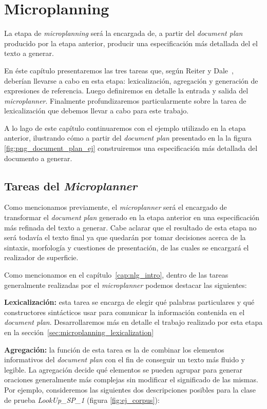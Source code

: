 \chapter{Microplanning}
\label{cap:microplanning}

La etapa de \textit{microplanning} será la encargada de, a partir del \textit{document plan} producido por la etapa anterior, producir una especificación más detallada del el texto a generar. 

En éste capítulo presentaremos las tres tareas que, según Reiter y Dale~\cite{reiter_dale}, deberían llevarse a cabo en esta etapa: lexicalización, agregación y generación de expresiones de referencia. Luego definiremos en detalle la entrada y salida del \textit{microplanner}. Finalmente profundizaremos particularmente sobre la tarea de lexicalización que debemos llevar a cabo para este trabajo.

A lo lago de este capítulo continuaremos con el ejemplo utilizado en la etapa anterior, ilustrando cómo a partir del \textit{document plan} presentado en la la figura \ref{fig:png_document_plan_ej} construiremos una especificación más detallada del documento a generar.

\section{Tareas del \textit{Microplanner}}

Como mencionamos previamente, el \textit{microplanner} será el encargado de transformar el \textit{document plan} generado en la etapa anterior en una especificación más refinada del texto a generar. Cabe aclarar que el resultado de esta etapa no será todavía el texto final ya que quedarán por tomar decisiones acerca de la sintaxis, morfología y cuestiones de presentación, de las cuales se encargará el realizador de superficie.

Como mencionamos en el capítulo~\ref{cap:nlg_intro}, dentro de las tareas generalmente realizadas por el \emph{microplanner} podemos destacar las siguientes:

\medskip
\noindent
\textbf{Lexicalización:} esta tarea se encarga de elegir qué palabras particulares y qué constructores sintácticos usar para comunicar la información contenida en el \textit{document plan}. Desarrollaremos más en detalle el trabajo realizado por esta etapa en la sección~\ref{sec:microplanning_lexicalization}


\medskip
\noindent
\textbf{Agregación:} la función de esta tarea es la de combinar los elementos informativos del \emph{document plan} con el fin de conseguir un texto más fluido y legible. La agregación decide qué elementos se pueden agrupar para generar oraciones generalmente más complejas sin modificar el significado de las mismas. Por ejemplo, consideremos las siguientes dos descripciones posibles para la clase de prueba \emph{LookUp\_SP\_1} (figura \ref{fig:ej_corpus}):


